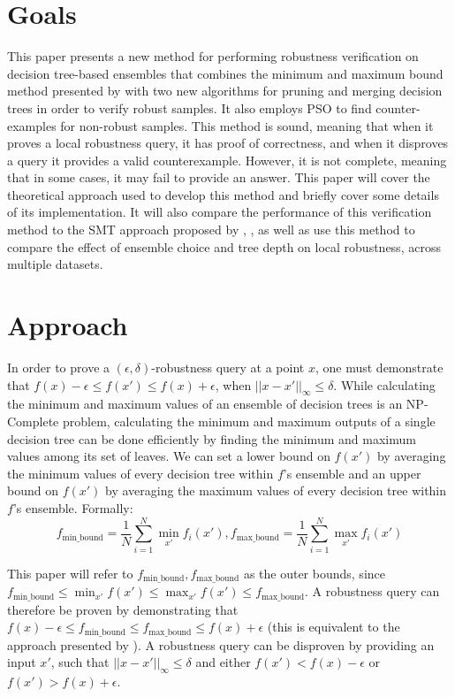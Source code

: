 \documentclass[pageno]{jpaper}
\newcommand{\fminb}{f_{\textrm{min\_bound}}}
\newcommand{\fmaxb}{f_{\textrm{max\_bound}}}
\begin{document}
\begin{doublespacing}
\section{Goals}
This paper presents a new method for performing robustness verification on decision tree-based ensembles that combines the minimum and maximum bound method presented by \cite{tornbloom} with two new algorithms for pruning and merging decision trees in order to verify robust samples. It also employs PSO to find counter-examples for non-robust samples. This method is sound, meaning that when it proves a local robustness query, it has proof of correctness, and when it disproves a query it provides a valid counterexample. However, it is not complete, meaning that in some cases, it may fail to provide an answer. This paper will cover the theoretical approach used to develop this method and briefly cover some details of its implementation. It will also compare the performance of this verification method to the SMT approach proposed by \cite{einziger}, \cite{nie}, as well as use this method to compare the effect of ensemble choice and tree depth on local robustness, across multiple datasets.

\section{Approach}
In order to prove a $(\epsilon, \delta)$-robustness query at a point $x$, one must demonstrate that $f(x) - \epsilon \le f(x') \le f(x) + \epsilon$, when $||x - x'||_\infty \le \delta$. While calculating the minimum and maximum values of an ensemble of decision trees is an NP-Complete problem, calculating the minimum and maximum outputs of a single decision tree can be done efficiently by finding the minimum and maximum values among its set of leaves. We can set a lower bound on $f(x')$ by averaging the minimum values of every decision tree within $f$'s ensemble and an upper bound on $f(x')$ by averaging the maximum values of every decision tree within $f$'s ensemble. Formally:
$$\fminb = \frac{1}{N} \sum_{i=1}^N \min_{x'} f_i (x'), \fmaxb = \frac{1}{N} \sum_{i=1}^N \max_{x'} f_i (x')$$

This paper will refer to $\fminb, \fmaxb$ as the outer bounds, since $\fminb \le \min_{x'} f(x') \le \max_{x'} f(x') \le \fmaxb$. A robustness query can therefore be proven by demonstrating that $f(x) - \epsilon \le \fminb \le \fmaxb \le f(x) + \epsilon$ (this is equivalent to the approach presented by \cite{tornbloom}). A robustness query can be disproven by providing an input $x'$, such that $||x - x'||_\infty \le \delta$ and either $f(x') < f(x) - \epsilon$ or $f(x') > f(x) + \epsilon$.


\end{doublespacing}
\end{document}
